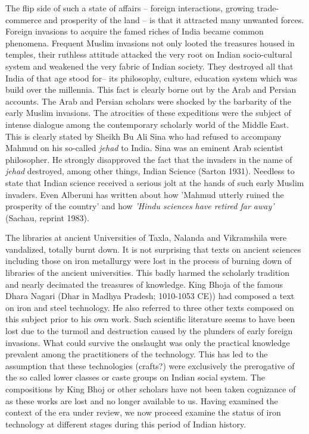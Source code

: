 The flip side of such a state of affairs – foreign interactions, growing trade-commerce and prosperity of the land – is that it attracted many unwanted forces. Foreign invasions to acquire the famed riches of India became common phenomena. Frequent Muslim invasions not only looted the treasures housed in temples, their ruthless attitude attacked the very root on Indian socio-cultural system and weakened the very fabric of Indian society. They destroyed all that India of that age stood for– its philosophy, culture, education system which was build over the millennia. This fact is clearly borne out by the Arab and Persian accounts. The Arab and Persian scholars were shocked by the barbarity of the early Muslim invasions. The atrocities of these expeditions were the subject of intense dialogue among the contemporary scholarly world of the Middle East. This is clearly stated by Sheikh Bu Ali Sina who had refused to accompany Mahmud on his so-called \textit{jehad} to India. Sina was an eminent Arab scientist philosopher. He strongly disapproved the fact that the invaders in the name of \textit{jehad} destroyed, among other things, Indian Science (Sarton 1931). Needless to state that Indian science received a serious jolt at the hands of such early Muslim invaders. Even Alberuni has written about how 'Mahmud utterly ruined the prosperity of the country' and how \textit{'Hindu sciences have retired far away'} (Sachau, reprint 1983).

The libraries at ancient Universities of Taxla, Nalanda and Vikramshila were vandalized, totally burnt down. It is not surprising that texts on ancient sciences including those on iron metallurgy were lost in the process of burning down of libraries of the ancient universities. This badly harmed the scholarly tradition and nearly decimated the treasures of knowledge. King Bhoja of the famous Dhara Nagari (Dhar in Madhya Pradesh; 1010-1053 CE)) had composed a text on iron and steel technology. He also referred to three other texts composed on this subject prior to his own work. Such scientific literature seems to have been lost due to the turmoil and destruction caused by the plunders of early foreign invasions. What could survive the onslaught was only the practical knowledge prevalent among the practitioners of the technology. This has led to the assumption that these technologies (crafts?) were exclusively the prerogative of the so called lower classes or caste groups on Indian social system. The compositions by King Bhoj or other scholars have not been taken cognizance of as these works are lost and no longer available to us. Having examined the context of the era under review, we now proceed examine the status of iron technology at different stages during this period of Indian history.

